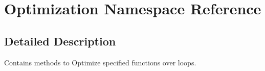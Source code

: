 \section{Optimization Namespace Reference}
\label{namespaceOptimization}


\subsection{Detailed Description}
Contains methods to Optimize specified functions over loops. 





